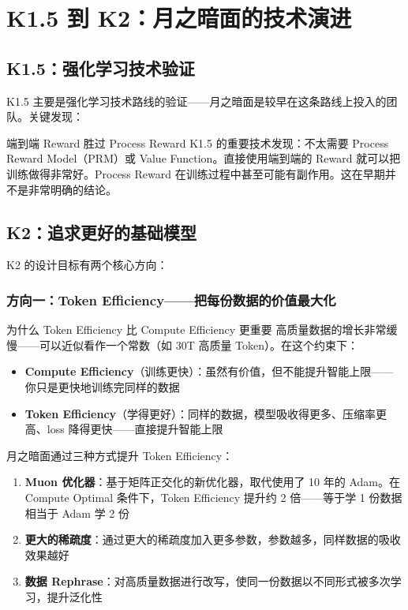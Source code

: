 \section{K1.5 到 K2：月之暗面的技术演进}

\subsection{K1.5：强化学习技术验证}

K1.5 主要是强化学习技术路线的验证——月之暗面是较早在这条路线上投入的团队。关键发现：

\begin{importantbox}{端到端 Reward 胜过 Process Reward}
K1.5 的重要技术发现：不太需要 Process Reward Model（PRM）或 Value Function。直接使用端到端的 Reward 就可以把训练做得非常好。Process Reward 在训练过程中甚至可能有副作用。这在早期并不是非常明确的结论。
\end{importantbox}

\subsection{K2：追求更好的基础模型}

K2 的设计目标有两个核心方向：

\subsubsection{方向一：Token Efficiency——把每份数据的价值最大化}

\begin{importantbox}{为什么 Token Efficiency 比 Compute Efficiency 更重要}
高质量数据的增长非常缓慢——可以近似看作一个常数（如 30T 高质量 Token）。在这个约束下：
\begin{itemize}
    \item \textbf{Compute Efficiency}（训练更快）：虽然有价值，但不能提升智能上限——你只是更快地训练完同样的数据
    \item \textbf{Token Efficiency}（学得更好）：同样的数据，模型吸收得更多、压缩率更高、loss 降得更快——直接提升智能上限
\end{itemize}
\end{importantbox}

月之暗面通过三种方式提升 Token Efficiency：

\begin{enumerate}
    \item \textbf{Muon 优化器}：基于矩阵正交化的新优化器，取代使用了 10 年的 Adam。在 Compute Optimal 条件下，Token Efficiency 提升约 2 倍——等于学 1 份数据相当于 Adam 学 2 份
    \item \textbf{更大的稀疏度}：通过更大的稀疏度加入更多参数，参数越多，同样数据的吸收效果越好
    \item \textbf{数据 Rephrase}：对高质量数据进行改写，使同一份数据以不同形式被多次学习，提升泛化性
\end{enumerate}

